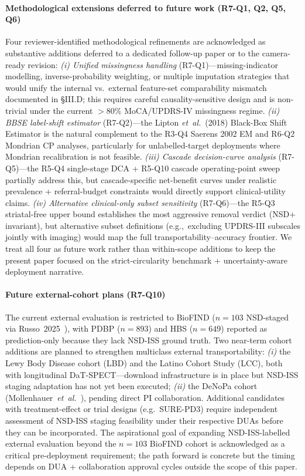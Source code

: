 \paragraph*{Methodological extensions deferred to future work (R7-Q1, Q2, Q5, Q6)} Four reviewer-identified methodological refinements are acknowledged as substantive additions deferred to a dedicated follow-up paper or to the camera-ready revision: \textit{(i) Unified missingness handling} (R7-Q1)---missing-indicator modelling, inverse-probability weighting, or multiple imputation strategies that would unify the internal vs.\ external feature-set comparability mismatch documented in §III.D; this requires careful causality-sensitive design and is non-trivial under the current $>$80\% MoCA/UPDRS-IV missingness regime. \textit{(ii) BBSE label-shift estimator} (R7-Q2)---the Lipton \emph{et~al.}~(2018) Black-Box Shift Estimator is the natural complement to the R3-Q4 Saerens 2002 EM and R6-Q2 Mondrian CP analyses, particularly for unlabelled-target deployments where Mondrian recalibration is not feasible. \textit{(iii) Cascade decision-curve analysis} (R7-Q5)---the R5-Q4 single-stage DCA + R5-Q10 cascade operating-point sweep partially address this, but cascade-specific net-benefit curves under realistic prevalence + referral-budget constraints would directly support clinical-utility claims. \textit{(iv) Alternative clinical-only subset sensitivity} (R7-Q6)---the R5-Q3 striatal-free upper bound establishes the most aggressive removal verdict (NSD$+$ invariant), but alternative subset definitions (e.g.,\ excluding UPDRS-III subscales jointly with imaging) would map the full transportability--accuracy frontier. We treat all four as future work rather than within-scope additions to keep the present paper focused on the strict-circularity benchmark + uncertainty-aware deployment narrative.

\paragraph*{Future external-cohort plans (R7-Q10)} The current external evaluation is restricted to BioFIND ($n{=}103$ NSD-staged via Russo~2025~\cite{russo2025}), with PDBP ($n{=}893$) and HBS ($n{=}649$) reported as prediction-only because they lack NSD-ISS ground truth. Two near-term cohort additions are planned to strengthen multiclass external transportability: \textit{(i)} the Lewy Body Disease cohort (LBD) and the Latino Cohort Study (LCC), both with longitudinal DaT-SPECT---download infrastructure is in place but NSD-ISS staging adaptation has not yet been executed; \textit{(ii)} the DeNoPa cohort (Mollenhauer~\textit{et~al.}~\cite{mollenhauer2017}), pending direct PI collaboration. Additional candidates with treatment-effect or trial designs (e.g.~SURE-PD3) require independent assessment of NSD-ISS staging feasibility under their respective DUAs before they can be incorporated. The aspirational goal of expanding NSD-ISS-labelled external evaluation beyond the $n{=}103$ BioFIND cohort is acknowledged as a critical pre-deployment requirement; the path forward is concrete but the timing depends on DUA + collaboration approval cycles outside the scope of this paper.

